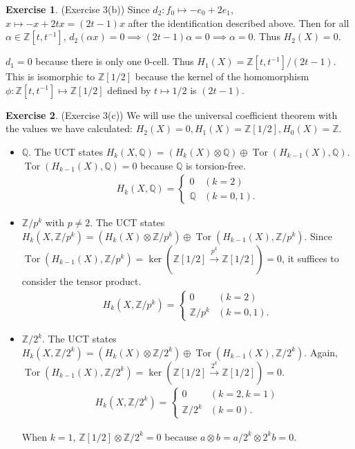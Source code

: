 \documentclass[12pt, psamsfonts]{amsart}
\theoremstyle{definition}
\newtheorem*{exer}{Exercise}
\theoremstyle{remark}
\DeclareMathOperator{\Tor}{Tor}
\numberwithin{equation}{section}
\begin{document}
\begin{exer}{(Exercise 3(b))}
  Since $d_2: f_0 \mapsto -e_0 + 2e_1$, $x \mapsto -x + 2tx = (2t - 1)x$ after the identification described above.
  Then for all $\alpha \in \mathbb{Z}[t, t^{-1}]$, $d_2(\alpha x) = 0 \implies (2t - 1)\alpha = 0 \implies \alpha = 0$.
  Thus $H_2(X) = 0$.

  $d_1 = 0$ because there is only one 0-cell.
  Thus $H_1(X) = \mathbb{Z}[t, t^{-1}] / (2t - 1)$.
  This is isomorphic to $\mathbb{Z}[1/2]$ because the kernel of the homomorphism $\phi: \mathbb{Z}[t, t^{-1}] \mapsto \mathbb{Z}[1/2]$ defined by $t \mapsto 1/2$ is $(2t - 1)$.
\end{exer}

\begin{exer}{(Exercise 3(c))}
  We will use the universal coefficient theorem with the values we have calculated: $H_2(X) = 0, H_1(X) = \mathbb{Z}[1/2], H_0(X) = \mathbb{Z}$.
  \begin{itemize}
    \item
      $\mathbb{Q}$.
      The UCT states $H_k(X, \mathbb{Q}) = (H_k(X) \otimes \mathbb{Q}) \oplus \Tor(H_{k - 1}(X), \mathbb{Q})$.
      $\Tor(H_{k - 1}(X), \mathbb{Q}) = 0$ because $\mathbb{Q}$ is torsion-free.
      \begin{align*}
        H_k(X, \mathbb{Q}) = \begin{cases}
          0 & (k = 2) \\
          \mathbb{Q} & (k = 0, 1).
        \end{cases}
      \end{align*}
    \item
      $\mathbb{Z}/p^k$ with $p \ne 2$.
      The UCT states $H_k(X, \mathbb{Z}/p^k) = (H_k(X) \otimes \mathbb{Z}/p^k) \oplus \Tor(H_{k - 1}(X), \mathbb{Z}/p^k)$.
      Since $\Tor(H_{k - 1}(X), \mathbb{Z}/p^k) = \ker(\mathbb{Z}[1/2] \xrightarrow{p^k} \mathbb{Z}[1/2]) = 0$, it suffices to consider the tensor product.
      \begin{align*}
        H_k(X, \mathbb{Z}/p^k) = \begin{cases}
          0 & (k = 2) \\
          \mathbb{Z}/p^k & (k = 0, 1).
        \end{cases}
      \end{align*}
    \item
      $\mathbb{Z}/2^k$.
      The UCT states $H_k(X, \mathbb{Z}/2^k) = (H_k(X) \otimes \mathbb{Z}/2^k) \oplus \Tor(H_{k - 1}(X), \mathbb{Z}/2^k)$.
      Again, $\Tor(H_{k - 1}(X), \mathbb{Z}/2^k) = \ker(\mathbb{Z}[1/2] \xrightarrow{2^k} \mathbb{Z}[1/2]) = 0$.
      \begin{align*}
        H_k(X, \mathbb{Z}/2^k) = \begin{cases}
          0 & (k = 2, k = 1) \\
          \mathbb{Z}/2^k & (k = 0).
        \end{cases}
      \end{align*}

      When $k = 1$, $\mathbb{Z}[1/2] \otimes \mathbb{Z}/2^k = 0$ because $a \otimes b = a/2^k \otimes 2^kb = 0$.
  \end{itemize}
\end{exer}
\end{document}
